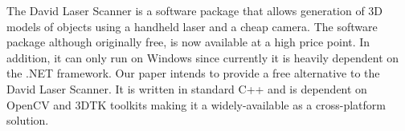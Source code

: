
The David Laser Scanner \cite{winkelbach:2006} is a software package that allows generation of 3D models of objects using a handheld laser and a cheap camera. The software package although originally free, is now available at a high price point. In addition, it can only run on Windows since currently it is heavily dependent on the .NET framework. Our paper intends to provide a free alternative to the David Laser Scanner. It is written in standard C++ and is dependent on OpenCV and \ac{3DTK} toolkits \cite{3dtk:2012} making it a widely-available as a cross-platform solution. 